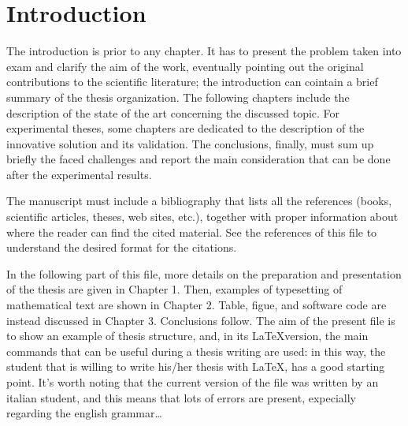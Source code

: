 %
%	 
%

\chapter*{Introduction}

The introduction is prior to any chapter. 
It has to present the problem taken into exam and clarify the aim of the work, eventually pointing out the original contributions to the scientific literature; the introduction can cointain a brief summary of the thesis organization. The following chapters include the description of the state of the art concerning the discussed topic. For experimental theses, some chapters are dedicated to the description of the innovative solution and its validation. The conclusions, finally, must sum up briefly the faced challenges and report the main consideration that can be done after the experimental results.

The manuscript must include a bibliography that lists all the references (books, scientific articles, theses, web sites, etc.), together with proper information about where the reader can find the cited material. See the references of this file to understand the desired format for the citations.

In the following part of this file, more details on the preparation and presentation of the thesis are given in Chapter 1. Then, examples of typesetting of mathematical text are shown in Chapter 2. Table, figue, and software code are instead discussed in Chapter 3. Conclusions follow. The aim of the present file is to show an example of thesis structure, and, in its \LaTeX version, the main commands that can be useful during a thesis writing are used: in this way, the student that is willing to write his/her thesis with \LaTeX, has a good starting point. It's worth noting that the current version of the file was written by an italian student, and this means that lots of errors are present, expecially regarding the english grammar\dots

